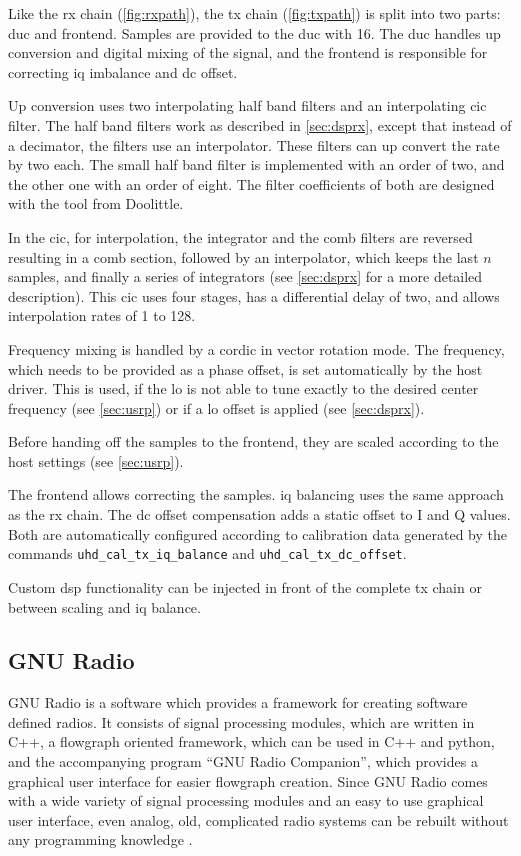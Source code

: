 \documentclass[12pt,a4paper,parskip=full,abstracton]{scrartcl}
\begin{document}
Like the \gls{rx} chain (\cref{fig:rxpath}), the \gls{tx} chain (\cref{fig:txpath})
is split into two parts: \gls{duc} and frontend. Samples are provided to the \gls{duc}
with \SI{16}{\bit}. The \gls{duc} handles up conversion and digital mixing of the signal,
and the frontend is responsible for correcting \gls{iq} imbalance and \gls{dc} offset.

Up conversion uses two interpolating half band filters and an interpolating \gls{cic}
filter. The half band filters work as described in \cref{sec:dsprx}, except that
instead of a decimator, the filters use an interpolator. These filters can up
convert the rate by two each. The small half band filter is implemented with an order of two,
and the other one with an order of eight. The filter coefficients of both are designed
with the tool from Doolittle\cite{halfband}.

In the \gls{cic}, for interpolation, the integrator and the comb filters are reversed resulting in
a comb section, followed by an interpolator, which keeps the last $n$ samples,
and finally a series of integrators (see \cref{sec:dsprx} for a more detailed
description). This \gls{cic} uses four stages, has a differential delay of two,
and allows interpolation rates of 1 to 128.

Frequency mixing is handled by a \gls{cordic} in vector rotation mode. The frequency,
which needs to be provided as a phase offset, is set automatically by the host driver.
This is used, if the \gls{lo} is not able to tune exactly to the desired center frequency
(see \cref{sec:usrp}) or if a \gls{lo} offset is applied (see \cref{sec:dsprx}).

Before handing off the samples to the frontend, they are scaled according to the
host settings (see \cref{sec:usrp}).

The frontend allows correcting the samples. \Gls{iq} balancing uses the same
approach as the \gls{rx} chain. The \gls{dc} offset compensation adds a
static offset to I and Q values. Both are automatically configured according
to calibration data generated by the commands
\verb+uhd_cal_tx_iq_balance+ and \verb+uhd_cal_tx_dc_offset+\cite{usrp_cal}.

Custom \gls{dsp} functionality can be injected in front of the complete \gls{tx} chain or between
scaling and \gls{iq} balance.


\subsection{GNU Radio}
\label{sec:intgnu}
GNU Radio is a software which provides a framework for creating software defined radios. It consists
of signal processing modules, which are written in C++, a flowgraph oriented framework, which can be
used in C++ and python, and the accompanying program ``GNU Radio Companion''\cite{gnuradio_grc},
which provides a graphical user interface for easier flowgraph creation. Since GNU Radio comes
with a wide variety of signal processing modules and an easy to use graphical user interface,
even analog, old, complicated radio systems can be rebuilt without any programming knowledge \cite{isee3}.
\end{document}
